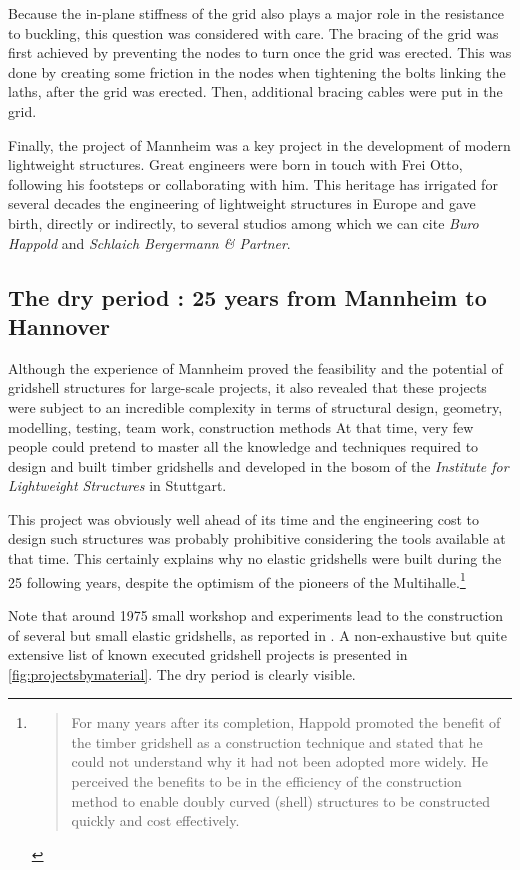 Because the in-plane stiffness of the grid also plays a major role in the resistance to buckling, this question was considered with care. The bracing of the grid was first achieved by preventing the nodes to turn once the grid was erected. This was done by creating some friction in the nodes when tightening the bolts linking the laths, after the grid was erected. Then, additional bracing cables were put in the grid.

Finally, the project of Mannheim was a key project in the development of modern lightweight structures. Great engineers were born in touch with Frei Otto, following his footsteps or collaborating with him. This heritage has irrigated for several decades the engineering of lightweight structures in Europe and gave birth, directly or indirectly, to several studios among which we can cite \emph{Buro Happold} and \emph{Schlaich Bergermann \& Partner}.

\subsection{The dry period : 25 years from Mannheim to Hannover}

Although the experience of Mannheim proved the feasibility and the potential of gridshell structures for large-scale projects, it also revealed that these projects were subject to an incredible complexity in terms of structural design, geometry, modelling, testing, team work, construction methods \telp{} At that time, very few people could pretend to master all the knowledge and techniques required to design and built timber gridshells and developed in the bosom of the \emph{Institute for Lightweight Structures} in Stuttgart.

This project was obviously well ahead of its time and the engineering cost to design such structures was probably prohibitive considering the tools available at that time. This certainly explains why no elastic gridshells were built during the 25 following years, despite the optimism of the pioneers of the Multihalle.\footnote{\blockcquote[]{Harris2003}{For many years after its completion, Happold promoted the benefit of the timber gridshell as a construction technique and stated that he could not understand why it had not been adopted more widely. He perceived the benefits to be in the efficiency of the construction method to enable doubly curved (shell) structures to be constructed quickly and cost effectively.}.}

Note that around 1975 small workshop and experiments lead to the construction of several but small elastic gridshells, as reported in \cite{IL10}. A non-exhaustive but quite extensive list of known executed gridshell projects is presented in \cref{fig:projectsbymaterial}. The dry period is clearly visible.

